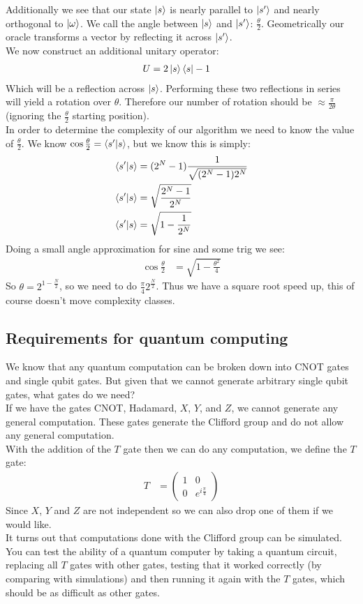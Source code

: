 Additionally we see that our state $\ket{s}$ is nearly parallel to $\ket{s'}$ and nearly orthogonal to $\ket{\omega}$. We call the angle between $\ket{s}$ and $\ket{s'}$: $\frac{\theta}{2}$. Geometrically our oracle transforms a vector by reflecting it across $\ket{s'}$.\\
We now construct an additional unitary operator:
\begin{align*}
	U &= 2\ket{s}\bra{s} - 1
\end{align*}
Which will be a reflection across $\ket{s}$. Performing these two reflections in series will yield a rotation over $\theta$. Therefore our number of rotation should be $\approx \frac{\pi}{2\theta}$ (ignoring the $\frac{\theta}{2}$ starting position). \\
In order to determine the complexity of our algorithm we need to know the value of $\frac{\theta}{2}$. We know $\cos\frac{\theta}{2} = \bra{s'}\ket{s}$, but we know this is simply:
\begin{align*}
	\bra{s'}\ket{s} &= (2^N -1)\frac{1}{\sqrt{(2^N-1)2^N}} \\
	\bra{s'}\ket{s} &= \sqrt{\frac{2^N-1}{2^N}} \\
	\bra{s'}\ket{s} &= \sqrt{1- \frac{1}{2^N}}
\end{align*}
Doing a small angle approximation for sine and some trig we see:
\begin{align*}
	\cos\frac{\theta}{2} &= \sqrt{1-\frac{\theta^2}{4}}
\end{align*}
So $\theta = 2^{1 -\frac{N}{2}}$, so we need to do $\frac{\pi}{4} 2^\frac{N}{2}$. Thus we have a square root speed up, this of course doesn't move complexity classes.
\subsection{Requirements for quantum computing}
We know that any quantum computation can be broken down into CNOT gates and single qubit gates. But given that we cannot generate arbitrary single qubit gates, what gates do we need?\\
If we have the gates CNOT, Hadamard, $X$, $Y$, and $Z$, we cannot generate any general computation. These gates generate the Clifford group and do not allow any general computation.\\
With the addition of the $T$ gate then we can do any computation, we define the $T$ gate:
\begin{align*}
	T &= \begin{pmatrix}
		1 & 0 \\
		0 & e^{i\frac{\pi}{4}}
      \end{pmatrix}
\end{align*}
Since $X$, $Y$ and $Z$ are not independent so we can also drop one of them if we would like. \\
It turns out that computations done with the Clifford group can be simulated. \\
You can test the ability of a quantum computer by taking a quantum circuit, replacing all $T$ gates with other gates, testing that it worked correctly (by comparing with simulations) and then running it again with the $T$ gates, which should be as difficult as other gates. \\
